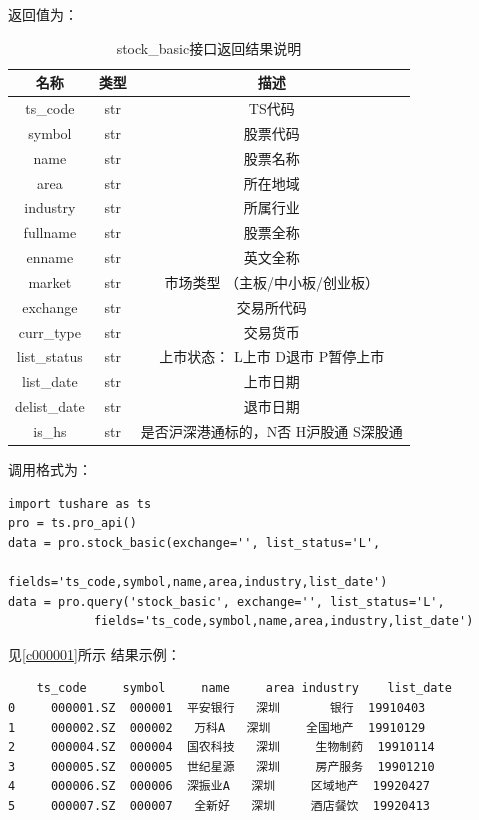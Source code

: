 \documentclass{article}
\begin{document}
返回值为：
\begin{table}[h]
\caption{stock\_basic接口返回结果说明}
\label{t000002}
\begin{tabular}{|c|c|c|} \hline
名称 & 类型 & 描述 \\ \hline  
ts\_code & str & TS代码 \\ \hline
symbol & str & 股票代码 \\ \hline
name & str & 股票名称 \\ \hline
area & str & 所在地域 \\ \hline
industry & str & 所属行业 \\ \hline
fullname & str & 股票全称 \\ \hline
enname & str & 英文全称 \\ \hline
market & str & 市场类型 （主板/中小板/创业板） \\ \hline
exchange & str & 交易所代码 \\ \hline
curr\_type & str & 交易货币 \\ \hline
list\_status & str & 上市状态： L上市 D退市 P暂停上市 \\ \hline
list\_date & str & 上市日期 \\ \hline
delist\_date & str & 退市日期 \\ \hline
is\_hs & str & 是否沪深港通标的，N否 H沪股通 S深股通 \\ \hline
\end{tabular}
\end{table}


调用格式为：
\begin{lstlisting}
import tushare as ts
pro = ts.pro_api()
data = pro.stock_basic(exchange='', list_status='L', 
                    fields='ts_code,symbol,name,area,industry,list_date')
data = pro.query('stock_basic', exchange='', list_status='L', 
			fields='ts_code,symbol,name,area,industry,list_date')
\end{lstlisting}
见\ref{c000001}所示
结果示例：
\begin{lstlisting}
    ts_code     symbol     name     area industry    list_date
0     000001.SZ  000001  平安银行   深圳       银行  19910403
1     000002.SZ  000002   万科A   深圳     全国地产  19910129
2     000004.SZ  000004  国农科技   深圳     生物制药  19910114
3     000005.SZ  000005  世纪星源   深圳     房产服务  19901210
4     000006.SZ  000006  深振业A   深圳     区域地产  19920427
5     000007.SZ  000007   全新好   深圳     酒店餐饮  19920413
\end{lstlisting}
\end{document}
